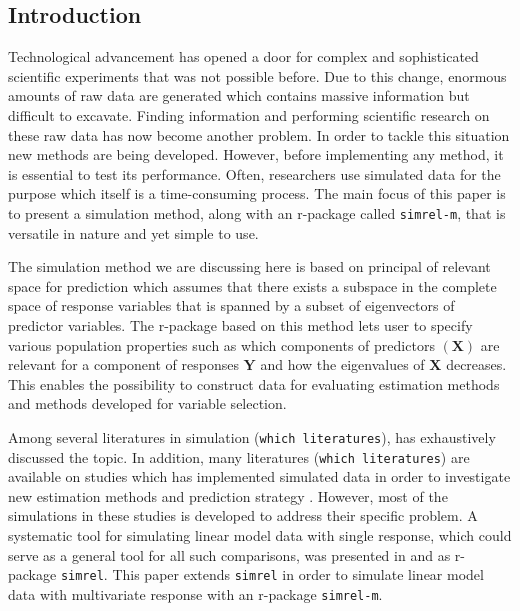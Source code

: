 \documentclass[12pt,A4paper,authoryear]{elsarticle} %
\begin{document}
\subsection{Introduction}\label{introduction}

Technological advancement has opened a door for complex and
sophisticated scientific experiments that was not possible before. Due
to this change, enormous amounts of raw data are generated which
contains massive information but difficult to excavate. Finding
information and performing scientific research on these raw data has now
become another problem. In order to tackle this situation new methods
are being developed. However, before implementing any method, it is
essential to test its performance. Often, researchers use simulated data
for the purpose which itself is a time-consuming process. The main focus
of this paper is to present a simulation method, along with an r-package
called \texttt{simrel-m}, that is versatile in nature and yet simple to
use.

The simulation method we are discussing here is based on principal of
relevant space for prediction \citep{helland1994comparison} which
assumes that there exists a subspace in the complete space of response
variables that is spanned by a subset of eigenvectors of predictor
variables. The r-package based on this method lets user to specify
various population properties such as which components of predictors
\((\mathbf{X})\) are relevant for a component of responses
\(\mathbf{Y}\) and how the eigenvalues of \(\mathbf{X}\) decreases. This
enables the possibility to construct data for evaluating estimation
methods and methods developed for variable selection.

Among several literatures in simulation
({\color{red}\texttt{which\ literatures}}), \citet{ripley2009stochastic}
has exhaustively discussed the topic. In addition, many literatures
({\color{red}\texttt{which\ literatures}}) are available on studies
which has implemented simulated data in order to investigate new
estimation methods and prediction strategy
\citep[see:][]{cook2015simultaneous, cook2013envelopes, helland2012near}.
However, most of the simulations in these studies is developed to
address their specific problem. A systematic tool for simulating linear
model data with single response, which could serve as a general tool for
all such comparisons, was presented in \citet{saebo2015simrel} and as
r-package \texttt{simrel}. This paper extends \texttt{simrel} in order
to simulate linear model data with multivariate response with an
r-package \texttt{simrel-m}.
\end{document}
